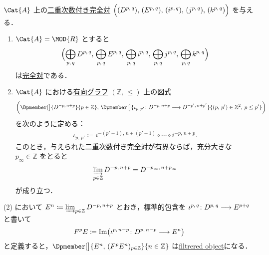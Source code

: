 \documentclass[algtopo_main]{subfiles}
\begin{document}
\begin{mylem}[label=lem:BEC-basic, breakable]{}
    $\Cat{A}$ 上の\hyperref[def:BEC]{二重次数付き完全対} $\Bigl( (D^{p,\, q}),\, (E^{p,\, q}),\, (i^{p,\, q}),\, (j^{p,\, q}),\, (k^{p,\, q}) \Bigr)$ を与える．
    \begin{enumerate}
        \item $\Cat{A} = \MOD{R}$ とすると
        \begin{align}
            \Bigl( \bigoplus_{p,\, q} D^{p,\, q},\, \bigoplus_{p,\, q} E^{p,\, q},\, \bigoplus_{p,\, q} i^{p,\, q},\, \bigoplus_{p,\, q} j^{p,\, q},\, \bigoplus_{p,\, q} k^{p,\, q} \Bigr)
        \end{align}
        は\hyperref[def:exact-couple]{完全対}である．
        \item $\Cat{A}$ における\hyperref[def:DG]{有向グラフ} $(\mathbb{Z},\, \le)$ 上の図式
        \begin{align}
            \biggl( \Dpmember[\big]{D^{-p,\, n+p}}{p \in \mathbb{Z}},\, \Dpmember[\big]{\iota_{p,\, p'} \colon D^{-p,\, n+p} \lto D^{-p',\, n+p'}}{(p,\, p') \in \mathbb{Z}^2,\, p \le p'} \biggr) 
        \end{align}
        を次のように定める：
        \begin{align}
            \iota_{p,\, p'} \coloneqq i^{-(p'-1),\, n+(p'-1)} \circ \cdots \circ i^{-p,\, n+p}.
        \end{align}
        このとき，与えられた二重次数付き完全対が\hyperref[def:filtration]{有界}ならば，充分大きな $p_\infty \in \mathbb{Z}$ をとると
        \begin{align}
            \varinjlim_{p \in \mathbb{Z}} D^{-p,\, n+p} = D^{-p_\infty,\, n+p_\infty} 
        \end{align}
        が成り立つ．
    \end{enumerate}
    \tcblower
    (2) において $E^n \coloneqq \varinjlim_{p \in \mathbb{Z}} D^{-p,\, n+p}$ とおき，標準的包含を
    $\iota^{p,\, q} \colon D^{p,\, q} \longrightarrow E^{p+q}$
    と書いて
    \begin{align}
        F^p E \coloneqq \Im \bigl( \iota^{p,\, n-p} \colon D^{p,\, n-p} \longrightarrow E^n \bigr) 
    \end{align}
    と定義すると，$\Dpmember[\big]{E^n,\, (F^pE^n)_{p \in \mathbb{Z}}}{n \in \mathbb{Z}}$ は\hyperref[def:filtration]{filtrered object}になる．
\end{mylem}
\end{document}
